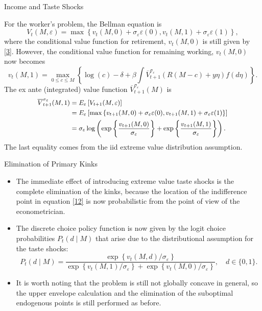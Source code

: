\documentclass[aspectratio=169]{beamer}
\newcommand{\highlight}[1]{{\color{red}{#1}}}
\begin{document}
\begin{frame}{Income and Taste Shocks}

	For the worker's problem, the Bellman equation is 
	\begin{equation}
		\label{12}
		V_t(M, \varepsilon)=\max \left\{v_t(M, 0)+\sigma_{\varepsilon} \varepsilon(0), v_t(M, 1)+\sigma_{\varepsilon} \varepsilon(1)\right\},
	\end{equation}
	where the conditional value function for retirement, $v_t(M,0)$ is still given by \ref{3}. However, the conditional value function for remaining working, $v_t(M,0)$ now becomes
	\begin{equation}
		\label{13}
		v_t(M, 1)=\max _{0 \leq c \leq M}\left\{\log (c)-\delta+\beta \int \overline{V}_{t+1}^{\sigma_{\varepsilon}}(R(M-c)+y \eta) f(d \eta)\right\}.
	\end{equation}
	The ex ante (integrated) value function $\overline{V}_{t+1}^{\sigma_{\varepsilon}}(M)$ is 
	\begin{equation}\small
		\label{14}
		\begin{aligned}
			\overline{V}_{t+1}^{\sigma_{\varepsilon}}(M, 1) & = E_{\varepsilon} \left[ V_{t+1} (M, \varepsilon) \right] \\
			& = E_{\varepsilon} \left[\max \left\{v_{t+1}(M, 0)+\sigma_{\varepsilon} \varepsilon(0), v_{t+1}(M, 1)+\sigma_{\varepsilon} \varepsilon(1)\right\}\right] \\
			& =\sigma_{\varepsilon} \log \left(\exp \left\{\frac{v_{t+1}(M, 0)}{\sigma_{\varepsilon}}  \right\}+\exp \left\{\frac{v_{t+1}(M, 1)}{\sigma_{\varepsilon}}\right\}\right) .
		\end{aligned}
	\end{equation}
	The last equality comes from the iid extreme value distribution assumption.
\end{frame}

\begin{frame}{Elimination of Primary Kinks}
	\begin{itemize}
		\item The immediate effect of introducing extreme value taste shocks is the complete elimination of the \highlight{primary} kinks, because the location of the indifference point in equation \ref{12} is now probabilistic from the point of view of the econometrician.
		\item The discrete choice policy function is now given by the logit choice probabilities $P_t(d \mid M)$ that arise due to the distributional assumption for the taste shocks:
		\begin{equation}
			\label{15}
			P_t(d \mid M)=\frac{\exp \left\{v_t(M, d) / \sigma_{\varepsilon}\right\}}{\exp \left\{v_t(M, 1) / \sigma_{\varepsilon}\right\}+\exp \left\{v_t(M, 0) / \sigma_{\varepsilon}\right\}}, \quad d \in\{0,1\} .
		\end{equation}
		
		\item It is worth noting that the problem is still not globally concave in general, so the upper envelope calculation and the elimination of the suboptimal endogenous points is still performed as before.
	\end{itemize}
\end{frame}
\end{document}
